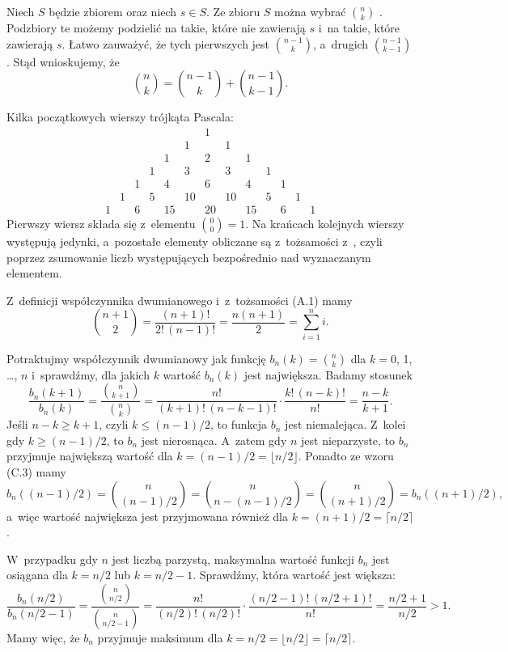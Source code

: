 \exercise %
Niech $S$ będzie zbiorem  oraz niech $s\in S$.
Ze zbioru $S$ można wybrać $\binom{n}{k}$ .
Podzbiory te możemy podzielić na takie, które nie zawierają $s$ i~na takie, które zawierają $s$.
Łatwo zauważyć, że tych pierwszych jest $\binom{n-1}{k}$, a~drugich $\binom{n-1}{k-1}$.
Stąd wnioskujemy, że
\[
    \binom{n}{k} = \binom{n-1}{k}+\binom{n-1}{k-1}.
\]

\exercise %
Kilka początkowych wierszy trójkąta Pascala:
\[
	\begin{array}{ccccccccccccc}
		&&&&&& 1 \\
		&&&&& 1 && 1 \\
		&&&& 1 && 2 && 1 \\
		&&& 1 && 3 && 3 && 1 \\
		&& 1 && 4 && 6 && 4 && 1 \\
		& 1 && 5 && 10 && 10 && 5 && 1 \\
		1 && 6 && 15 && 20 && 15 && 6 && 1
	\end{array}
\]
Pierwszy wiersz składa się z~elementu $\binom{0}{0}=1$.
Na krańcach kolejnych wierszy występują jedynki, a~pozostałe elementy obliczane są z~tożsamości z~, czyli poprzez zsumowanie liczb występujących bezpośrednio nad wyznaczanym elementem.

\exercise %
Z~definicji współczynnika dwumianowego i~z~tożsamości (A.1) mamy
\[
	\binom{n+1}{2} = \frac{(n+1)!}{2!\,(n-1)!} = \frac{n(n+1)}{2} = \sum_{i=1}^ni.
\]

\exercise %
Potraktujmy współczynnik dwumianowy jak funkcję $b_n(k)=\binom{n}{k}$ dla $k=0$, 1, \dots, $n$ i~sprawdźmy, dla jakich $k$ wartość $b_n(k)$ jest największa.
Badamy stosunek
\[
	\frac{b_n(k+1)}{b_n(k)} = \frac{\binom{n}{k+1}}{\binom{n}{k}} = \frac{n!}{(k+1)!\,(n-k-1)!}\cdot\frac{k!\,(n-k)!}{n!} = \frac{n-k}{k+1}.
\]
Jeśli $n-k\ge k+1$, czyli $k\le(n-1)/2$, to funkcja $b_n$ jest niemalejąca.
Z~kolei gdy $k\ge(n-1)/2$, to $b_n$ jest nierosnąca.
A~zatem gdy $n$ jest nieparzyste, to $b_n$ przyjmuje największą wartość dla $k=(n-1)/2=\lfloor n/2\rfloor$.
Ponadto ze wzoru (C.3) mamy
\[
    b_n((n-1)/2) = \binom{n}{(n-1)/2} = \binom{n}{n-(n-1)/2} = \binom{n}{(n+1)/2} = b_n((n+1)/2),
\]
a~więc wartość największa jest przyjmowana również dla $k=(n+1)/2=\lceil n/2\rceil$.

W~przypadku gdy $n$ jest liczbą parzystą, maksymalna wartość funkcji $b_n$ jest osiągana dla $k=n/2$ lub $k=n/2-1$.
Sprawdźmy, która wartość jest większa:
\[
    \frac{b_n(n/2)}{b_n(n/2-1)} = \frac{\binom{n}{n/2}}{\binom{n}{n/2-1}} = \frac{n!}{(n/2)!\,(n/2)!}\cdot\frac{(n/2-1)!\,(n/2+1)!}{n!} = \frac{n/2+1}{n/2} > 1.
\]
Mamy więc, że $b_n$ przyjmuje maksimum dla $k=n/2=\lfloor n/2\rfloor=\lceil n/2\rceil$.

